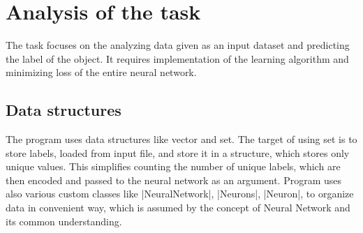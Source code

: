 \documentclass[12pt,a4paper,twoside]{article}
\let\oldmarginpar\marginpar
\renewcommand\marginpar[1]{%
  {\linespread{0.85}\normalfont\scriptsize%
\oldmarginpar[\hspace{1cm}\begin{minipage}{3cm}\raggedleft\scriptsize\color{black}\textsf{#1}\end{minipage}]%
{\hspace{0cm}\begin{minipage}{3cm}\raggedright\scriptsize\color{black}\textsf{#1}\end{minipage}}%
}%
}
\begin{document}

\section{Analysis of the task}

The task focuses on the analyzing data given as an input dataset and predicting the label of the object. It requires implementation of the learning algorithm and minimizing loss of the entire neural network.

\subsection{Data structures}
The program uses data structures like vector and set. The target of using set is to store labels, loaded from input file, and store it in a structure, which stores only unique values. This simplifies counting the number of unique labels, which are then encoded and passed to the neural network as an argument. Program uses also various custom classes like \lstline|NeuralNetwork|, \lstline|Neurons|,  \lstline|Neuron|, to organize data in convenient way, which is assumed by the concept of Neural Network and its common understanding.
\end{document}
